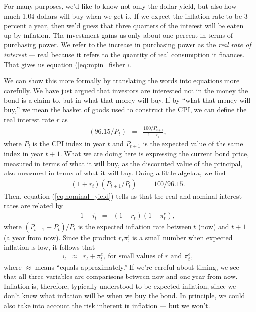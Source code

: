 For many purposes, we'd like to know not only the dollar yield, but
also how much 1.04 dollars will buy when we get it.  If we expect
the inflation rate to be 3 percent a year, then we'd guess that three quarters of the
interest will be eaten up by inflation.  The investment gains
us only about one percent in terms of purchasing power.
We refer to the increase in purchasing power as the
{\it real rate of interest\/} --- real because it refers to the
quantity of real consumption it finances.
That gives us equation (\ref{eq:mpin_fisher}).


We can show this more formally
by translating the words into equations more carefully.
We have just argued that investors are interested not in the money the
bond is a claim to, but in what that money will buy. If by ``what
that money will buy,'' we mean the basket of goods used to construct
the CPI, we can define the real interest rate $r$ as
%
\begin{eqnarray*}
    (96.15/P_t) &=& \frac{100/ P_{t+1}}{1+r_t},
\end{eqnarray*}
%
where $P_{t}$ is the CPI index in year $t$ and $P_{t+1}$ is the
expected value of the same index in year $t+1$. What we are doing
here is expressing the current bond price, measured in terms of what
it will buy, as the discounted value of the principal, also measured
in terms of what it will buy. Doing a little algebra, we find
%
\begin{eqnarray*}
    (1+r_t)(P_{t+1}/P_{t}) &=& 100/96.15.
\end{eqnarray*}
%
Then, equation (\ref{eq:nominal_yield}) tells us that the real and
nominal interest rates are related by
\begin{eqnarray*}
    1 + i_t   &=& (1+r_t)(1+\pi_{t}^e),
\end{eqnarray*}
where $(P_{t+1}-P_t)/P_t $ is the expected inflation rate between
$t$ (now) and $t+1$ (a year from now). Since the product
$r_{t}\pi_{t}^e$ is a small number when expected inflation is low, it follows that
\begin{eqnarray*}
    i_t  &\approx&  r_t + \pi_{t}^e, \ \mbox{for \ small \ values \ of \ $r$ and $\pi_{t}^e$},
\end{eqnarray*}
where $\approx$ means ``equals approximately.''
If we're careful about timing, we see that all three variables
are comparisons between now and one year from now.
Inflation is, therefore, typically understood to be
expected inflation, since we don't know what inflation
will be when we buy the bond.
In principle, we could also take into account the risk
inherent in inflation --- but we won't.


